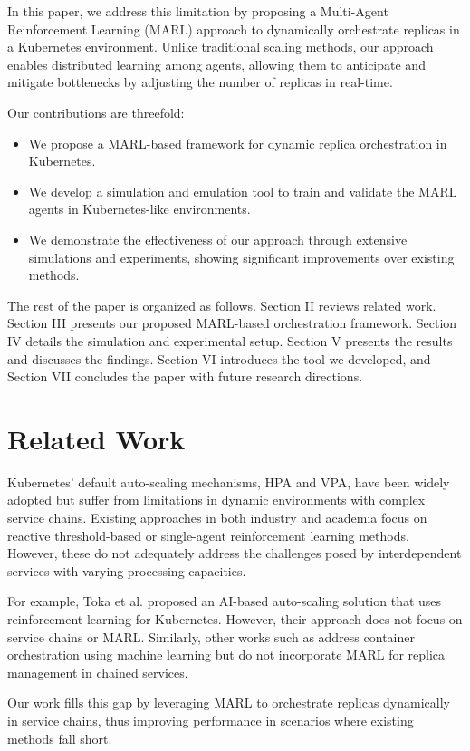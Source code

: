 \documentclass[conference]{IEEEtran}
\begin{document}
In this paper, we address this limitation by proposing a Multi-Agent Reinforcement Learning (MARL) approach to dynamically orchestrate replicas in a Kubernetes environment. Unlike traditional scaling methods, our approach enables distributed learning among agents, allowing them to anticipate and mitigate bottlenecks by adjusting the number of replicas in real-time.

Our contributions are threefold:
\begin{itemize}
    \item We propose a MARL-based framework for dynamic replica orchestration in Kubernetes.
    \item We develop a simulation and emulation tool to train and validate the MARL agents in Kubernetes-like environments.
    \item We demonstrate the effectiveness of our approach through extensive simulations and experiments, showing significant improvements over existing methods.
\end{itemize}

The rest of the paper is organized as follows. Section II reviews related work. Section III presents our proposed MARL-based orchestration framework. Section IV details the simulation and experimental setup. Section V presents the results and discusses the findings. Section VI introduces the tool we developed, and Section VII concludes the paper with future research directions.

\section{Related Work}
Kubernetes' default auto-scaling mechanisms, HPA and VPA, have been widely adopted but suffer from limitations in dynamic environments with complex service chains. Existing approaches in both industry and academia focus on reactive threshold-based or single-agent reinforcement learning methods. However, these do not adequately address the challenges posed by interdependent services with varying processing capacities. 

For example, Toka et al. \cite{toka2020} proposed an AI-based auto-scaling solution that uses reinforcement learning for Kubernetes. However, their approach does not focus on service chains or MARL. Similarly, other works such as \cite{related1,related2} address container orchestration using machine learning but do not incorporate MARL for replica management in chained services.

Our work fills this gap by leveraging MARL to orchestrate replicas dynamically in service chains, thus improving performance in scenarios where existing methods fall short.
\end{document}
